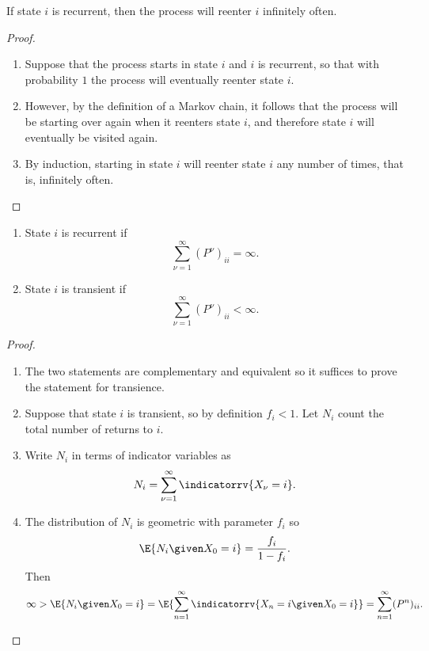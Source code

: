 \documentclass[12pt]{article}
\begin{document}
\begin{enumerate}
\begin{proposition}
    If state \( i \) is recurrent, then the process will reenter \( i \)
    infinitely often.
\end{proposition}

\begin{proof}
    \begin{enumerate}
        \item
            Suppose that the process starts in state \( i \) and \( i \)
            is recurrent, so that with probability \( 1 \) the process
            will eventually reenter state \( i \).
        \item
            However, by the definition of a Markov chain, it follows
            that the process will be starting over again when it
            reenters state \( i \), and therefore state \( i \) will
            eventually be visited again.
        \item
            By induction, starting in state \( i \) will reenter state \(
            i \) any number of times, that is, infinitely often.
    \end{enumerate}
\end{proof}

\begin{proposition}
    \begin{enumerate}
        \item
            State \( i \) is recurrent if
            \[
                \sum\limits_{\nu=1}^{\infty} (P^{\nu})_{ii} = \infty.
            \]
        \item
            State \( i \) is transient if
            \[
                \sum\limits_{\nu=1}^{\infty} (P^\nu)_{ii} < \infty.
            \]
    \end{enumerate}
\end{proposition}

\begin{proof}
    \begin{enumerate}
        \item
            The two statements are complementary and equivalent so it
            suffices to prove the statement for transience.
        \item
            Suppose that state \( i \) is transient, so by definition \(
            f_i <1 \).  Let \( N_i \) count the total number of returns
            to \( i \).
        \item
            Write \( N_i \) in terms of indicator variables as
            \[
                N_i = \sum\limits_{\nu=1}^{\infty} \indicatorrv{X_\nu=i}.
            \]
        \item
            The distribution of \( N_i \) is geometric with parameter \(
            f_i \) so
            \[
                \E{N_i \given X_0 = i} = \frac{f_i}{1 - f_i}.
            \] Then
            \[
                \infty > \E{N_i \given X_0 = i} = \E{ \sum\limits_{n=1}^
                {\infty} \indicatorrv{X_n=i \given X_0=i}} = \sum\limits_
                {n=1}^{\infty} (P^n)_{ii}.
            \]
    \end{enumerate}
\end{proof}


\end{enumerate}
\end{document}

